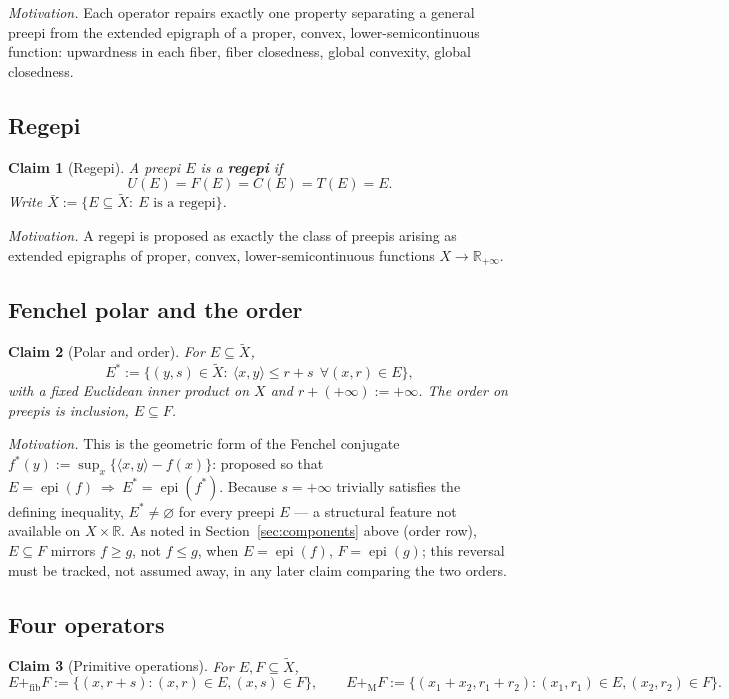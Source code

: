 \documentclass[11pt]{article}
\newtheorem{claim}{Claim}
\newcommand{\R}{\mathbb R}
\newcommand{\Rp}{\mathbb R_{+\infty}}
\newcommand{\epi}{\operatorname{epi}}
\newcommand{\fibsum}{+_{\mathrm{fib}}}
\newcommand{\Msum}{+_{\mathrm M}}
\begin{document}
\emph{Motivation.} Each operator repairs exactly one property separating a
general preepi from the extended epigraph of a proper, convex,
lower-semicontinuous function: upwardness in each fiber, fiber closedness,
global convexity, global closedness.

\subsection{Regepi}

\begin{claim}[Regepi]\label{cl:regepi}
A preepi $E$ is a \textbf{regepi} if
\[
U(E)=F(E)=C(E)=T(E)=E.
\]
Write $\bar X:=\{E\subseteq\tilde X:\ E\text{ is a regepi}\}$.
\end{claim}

\emph{Motivation.} A regepi is proposed as exactly the class of preepis
arising as extended epigraphs of proper, convex, lower-semicontinuous
functions $X\to\Rp$.

\subsection{Fenchel polar and the order}

\begin{claim}[Polar and order]\label{cl:polar}
For $E\subseteq\tilde X$,
\[
E^*:=\{(y,s)\in\tilde X:\ \langle x,y\rangle\le r+s\ \ \forall(x,r)\in E\},
\]
with a fixed Euclidean inner product on $X$ and $r+(+\infty):=+\infty$.
The order on preepis is inclusion, $E\subseteq F$.
\end{claim}

\emph{Motivation.} This is the geometric form of the Fenchel conjugate
$f^*(y):=\sup_x\{\langle x,y\rangle-f(x)\}$: proposed so that
$E=\epi(f)\ \Rightarrow\ E^*=\epi(f^*)$. Because $s=+\infty$ trivially
satisfies the defining inequality, $E^*\ne\varnothing$ for every preepi
$E$ — a structural feature not available on $X\times\R$. As noted in
Section~\ref{sec:components} above (order row), $E\subseteq F$ mirrors
$f\ge g$, not $f\le g$, when $E=\epi(f)$, $F=\epi(g)$; this reversal must
be tracked, not assumed away, in any later claim comparing the two orders.

\subsection{Four operators}\label{sec:operators}

\begin{claim}[Primitive operations]\label{cl:primitive}
For $E,F\subseteq\tilde X$,
\[
E\fibsum F:=\{(x,r+s):(x,r)\in E,(x,s)\in F\},\qquad
E\Msum F:=\{(x_1+x_2,r_1+r_2):(x_1,r_1)\in E,(x_2,r_2)\in F\}.
\]
\end{claim}
\end{document}
